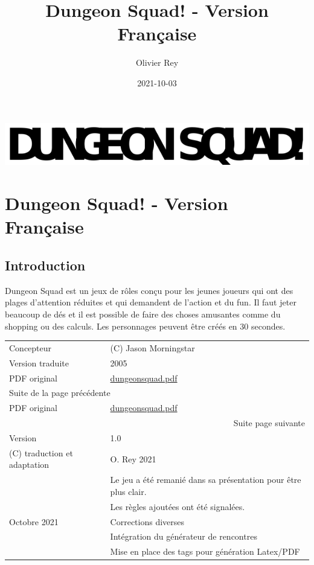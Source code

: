 \documentclass[a4paper, 11pt, twoside]{article}
\author{Olivier Rey}
\date{2021-10-03}
\title{Dungeon Squad! - Version Française}
\begin{document}
\maketitle
\tableofcontents

\newpage

\begin{center}
\includegraphics[width=.9\linewidth]{logo.png}
\end{center}

\section{Dungeon Squad! - Version Française}
\label{sec:org4a12f73}

\subsection{Introduction}
\label{sec:org710cee6}

Dungeon Squad est un jeux de rôles conçu pour les jeunes joueurs qui ont des plages d'attention réduites et qui demandent de l'action et du fun. Il faut jeter beaucoup de dés et il est possible de faire des choses amusantes comme du shopping ou des calculs. Les personnages peuvent être créés en 30 secondes.

\begin{longtable}{|l|l|}
\hline
Concepteur & (C) Jason Morningstar\\
Version traduite & 2005\\
PDF original & \href{https://github.com/orey/jdr/blob/master/DungeonSquad-fr/dungeon\_squad.pdf}{dungeonsquad.pdf}\\
\hline
\endfirsthead
\multicolumn{2}{l}{Suite de la page précédente} \\

PDF original & \href{https://github.com/orey/jdr/blob/master/DungeonSquad-fr/dungeon\_squad.pdf}{dungeonsquad.pdf} \\

\hline
\endhead
\hline\multicolumn{2}{r}{Suite page suivante} \\
\endfoot
\endlastfoot
\hline
Version & 1.0\\
\hline
(C) traduction et adaptation & O. Rey 2021\\
 & Le jeu a été remanié dans sa présentation pour être plus clair.\\
 & Les règles ajoutées ont été signalées.\\
Octobre 2021 & Corrections diverses\\
 & Intégration du générateur de rencontres\\
 & Mise en place des tags pour génération Latex/PDF\\
\hline
\end{longtable}
\end{document}

